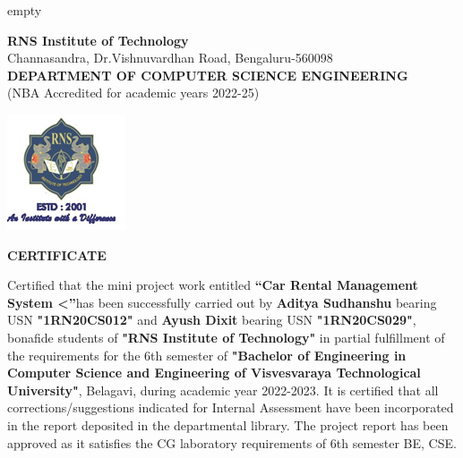 
\newenvironment{certificate1}

	\clearpage\thispagestyle{empty}
	
	\begin{center}	
			\textbf{RNS Institute of Technology}\\
{\footnotesize{Channasandra, Dr.Vishnuvardhan Road, Bengaluru-560098}}\\
\textbf{DEPARTMENT OF COMPUTER SCIENCE  ENGINEERING} \\
{\footnotesize{(NBA Accredited for academic years 2022-25)}}\\
\end{center}
	
	\begin{center}
		\includegraphics[scale=0.8]{logo.png}	
	\end{center}
	\begin{center}
		\textbf{CERTIFICATE}
	\end{center}
	
Certified that the mini project work entitled \textbf{“Car Rental Management System <”}has been successfully carried out by  \textbf{Aditya Sudhanshu} bearing USN  \textbf{"1RN20CS012"} and \textbf{Ayush Dixit} bearing USN  \textbf{"1RN20CS029"}, bonafide students of  \textbf{"RNS Institute of Technology"} in partial fulfillment of the requirements for the 6th semester  of  \textbf{"Bachelor of Engineering in Computer Science and Engineering of Visvesvaraya Technological University"}, Belagavi, during academic year 2022-2023. It is certified that all corrections/suggestions indicated for Internal Assessment have been incorporated in the report deposited in the departmental library. The project report has been approved as it satisfies the CG laboratory requirements of 6th semester BE, CSE. 	
\\
	
